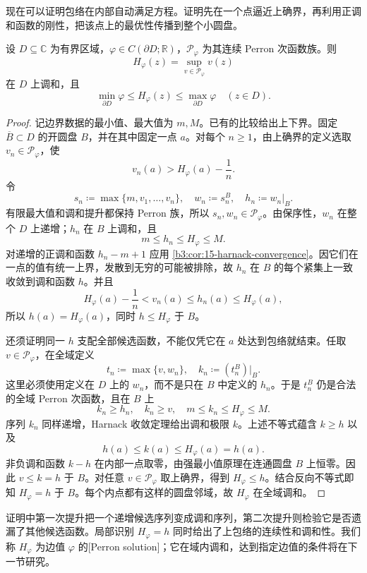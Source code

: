 现在可以证明包络在内部自动满足方程。证明先在一个点逼近上确界，再利用正调和函数的刚性，把该点上的最优性传播到整个小圆盘。

\begin{theorem}[Perron]\label{b3:thm:16-perron}
设 \(D\subseteq\mathbb C\) 为有界区域，\(\varphi\in C(\partial D;\mathbb R)\)，\(\mathcal P_\varphi\) 为其连续 Perron 次函数族。则
\[
 H_\varphi(z)=\sup_{v\in\mathcal P_\varphi}v(z)
\]
在 \(D\) 上调和，且
\[
 \min_{\partial D}\varphi\le H_\varphi(z)
 \le\max_{\partial D}\varphi\quad(z\in D).
\]
\end{theorem}
\begin{proof}
记边界数据的最小值、最大值为 \(m,M\)。已有的比较给出上下界。固定 \(\overline B\subset D\) 的开圆盘 \(B\)，并在其中固定一点 \(a\)。对每个 \(n\ge1\)，由上确界的定义选取 \(v_n\in\mathcal P_\varphi\)，使
\[
 v_n(a)>H_\varphi(a)-\frac1n.
\]
令
\[
 s_n\coloneqq\max\{m,v_1,\ldots,v_n\},
 \quad w_n\coloneqq s_n^B,
 \quad h_n\coloneqq w_n|_B.
\]
有限最大值和调和提升都保持 Perron 族，所以 \(s_n,w_n\in\mathcal P_\varphi\)。由保序性，\(w_n\) 在整个 \(D\) 上递增；\(h_n\) 在 \(B\) 上调和，且
\[
 m\le h_n\le H_\varphi\le M.
\]
对递增的正调和函数 \(h_n-m+1\) 应用 \cref{b3:cor:15-harnack-convergence}。因它们在一点的值有统一上界，发散到无穷的可能被排除，故 \(h_n\) 在 \(B\) 的每个紧集上一致收敛到调和函数 \(h\)。并且
\[
 H_\varphi(a)-\frac1n<v_n(a)\le h_n(a)\le H_\varphi(a),
\]
所以 \(h(a)=H_\varphi(a)\)，同时 \(h\le H_\varphi\) 于 \(B\)。

还须证明同一 \(h\) 支配全部候选函数，不能仅凭它在 \(a\) 处达到包络就结束。任取 \(v\in\mathcal P_\varphi\)，在全域定义
\[
 t_n\coloneqq\max\{v,w_n\},
 \quad k_n\coloneqq (t_n^B)|_B.
\]
这里必须使用定义在 \(D\) 上的 \(w_n\)，而不是只在 \(B\) 中定义的 \(h_n\)。于是 \(t_n^B\) 仍是合法的全域 Perron 次函数，且在 \(B\) 上
\[
 k_n\ge h_n,\quad k_n\ge v,\quad m\le k_n\le H_\varphi\le M.
\]
序列 \(k_n\) 同样递增，Harnack 收敛定理给出调和极限 \(k\)。上述不等式蕴含 \(k\ge h\) 以及
\[
 h(a)\le k(a)\le H_\varphi(a)=h(a).
\]
非负调和函数 \(k-h\) 在内部一点取零，由强最小值原理在连通圆盘 \(B\) 上恒零。因此 \(v\le k=h\) 于 \(B\)。对任意 \(v\in\mathcal P_\varphi\) 取上确界，得到 \(H_\varphi\le h\)。结合反向不等式即知 \(H_\varphi=h\) 于 \(B\)。每个内点都有这样的圆盘邻域，故 \(H_\varphi\) 在全域调和。
\end{proof}

证明中第一次提升把一个递增候选序列变成调和序列，第二次提升则检验它是否遗漏了其他候选函数。局部识别 \(H_\varphi=h\) 同时给出了上包络的连续性和调和性。我们称 \(H_\varphi\) 为边值 \(\varphi\) 的[Perron solution]；它在域内调和，达到指定边值的条件将在下一节研究。

